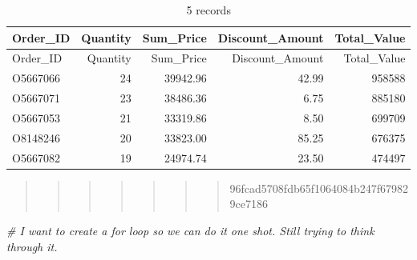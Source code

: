 \documentclass[
]{article}
\newenvironment{Shaded}{\begin{snugshade}}{\end{snugshade}}
\newcommand{\CommentTok}[1]{\textcolor[rgb]{0.56,0.35,0.01}{\textit{#1}}}
\begin{document}
\begin{longtable}[]{@{}lrrrr@{}}
\caption{5 records}\tabularnewline
\toprule\noalign{}
Order\_ID & Quantity & Sum\_Price & Discount\_Amount & Total\_Value \\
\midrule\noalign{}
\endfirsthead
\toprule\noalign{}
Order\_ID & Quantity & Sum\_Price & Discount\_Amount & Total\_Value \\
\midrule\noalign{}
\endhead
\bottomrule\noalign{}
\endlastfoot
O5667066 & 24 & 39942.96 & 42.99 & 958588 \\
O5667071 & 23 & 38486.36 & 6.75 & 885180 \\
O5667053 & 21 & 33319.86 & 8.50 & 699709 \\
O8148246 & 20 & 33823.00 & 85.25 & 676375 \\
O5667082 & 19 & 24974.74 & 23.50 & 474497 \\
\end{longtable}

\begin{quote}
\begin{quote}
\begin{quote}
\begin{quote}
\begin{quote}
\begin{quote}
\begin{quote}
96fcad5708fdb65f1064084b247f679829ce7186
\end{quote}
\end{quote}
\end{quote}
\end{quote}
\end{quote}
\end{quote}
\end{quote}

\begin{Shaded}
\begin{Highlighting}[]
\CommentTok{\# I want to create a for loop so we can do it one shot. Still trying to think through it. }
\end{Highlighting}
\end{Shaded}
\end{document}
